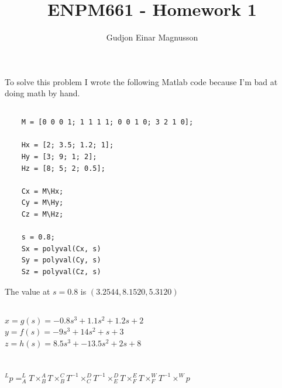 \documentclass[12pt]{article}
\begin{document}
\title{ENPM661 - Homework 1}
\author{Gudjon Einar Magnusson}

\maketitle

\section{} %

To solve this problem I wrote the following Matlab code because I'm bad at doing math by hand.

\subsection{}
\begin{minipage}{\linewidth}
\begin{lstlisting}
    M = [0 0 0 1; 1 1 1 1; 0 0 1 0; 3 2 1 0];

    Hx = [2; 3.5; 1.2; 1];
    Hy = [3; 9; 1; 2];
    Hz = [8; 5; 2; 0.5];

    Cx = M\Hx;
    Cy = M\Hy;
    Cz = M\Hz;

    s = 0.8;
    Sx = polyval(Cx, s)
    Sy = polyval(Cy, s)
    Sz = polyval(Cz, s)
\end{lstlisting}
\end{minipage}

The value at $s=0.8$ is $(3.2544, 8.1520, 5.3120)$

\subsection{}
$x = g(s) = -0.8s^3 + 1.1s^2 + 1.2s + 2$\\
$y = f(s) = -9s^3 + 14s^2 + s + 3$\\
$z = h(s) = 8.5s^3 + -13.5s^2 + 2s + 8$\\


\section{} %

$^{L}p = 
 ^{L}_{A}T \times
 ^{A}_{B}T \times
 ^{C}_{B}T^{-1} \times
 ^{D}_{C}T^{-1} \times
 ^{D}_{E}T \times
 ^{E}_{F}T \times
 ^{W}_{F}T^{-1} \times 
 ^{W}p$


\section{} %
\end{document}
